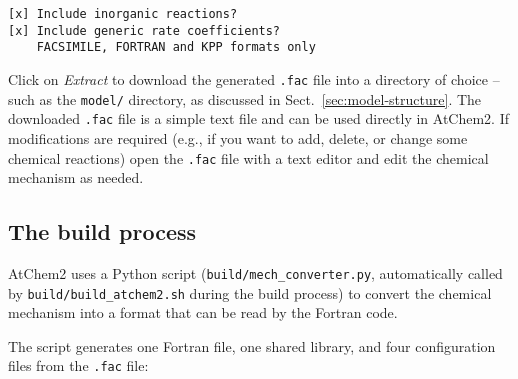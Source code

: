 \begin{verbatim}
[x] Include inorganic reactions?
[x] Include generic rate coefficients?
    FACSIMILE, FORTRAN and KPP formats only
\end{verbatim}

Click on \emph{Extract} to download the generated \texttt{.fac} file
into a directory of choice -- such as the \texttt{model/} directory,
as discussed in Sect.~\ref{sec:model-structure}. The downloaded
\texttt{.fac} file is a simple text file and can be used directly in
AtChem2. If modifications are required (e.g., if you want to add,
delete, or change some chemical reactions) open the \texttt{.fac} file
with a text editor and edit the chemical mechanism as needed.

\subsection{The build process} \label{subsec:build-process}

AtChem2 uses a Python script (\texttt{build/mech\_converter.py},
automatically called by \texttt{build/build\_atchem2.sh} during the build
process) to convert the chemical mechanism into a format that can be
read by the Fortran code.

The script generates one Fortran file, one shared library, and four
configuration files from the \texttt{.fac} file:

